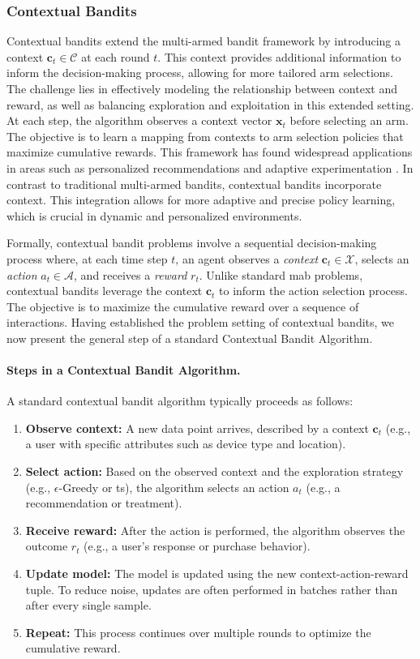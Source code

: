 \subsubsection{Contextual Bandits}
Contextual bandits extend the multi-armed bandit framework by introducing a context $\mathbf{c}_t \in \mathcal{C}$ at each round $t$. This context provides additional information to inform the decision-making process, allowing for more tailored arm selections. The challenge lies in effectively modeling the relationship between context and reward, as well as balancing exploration and exploitation in this extended setting. At each step, the algorithm observes a context vector $\mathbf{x}_t$ before selecting an arm. The objective is to learn a mapping from contexts to arm selection policies that maximize cumulative rewards. This framework has found widespread applications in areas such as personalized recommendations and adaptive experimentation \citep{li2010contextual}. In contrast to traditional multi-armed bandits, contextual bandits incorporate context. This integration allows for more adaptive and precise policy learning, which is crucial in dynamic and personalized environments.
 
Formally, contextual bandit problems involve a sequential decision-making process where, at each time step $t$, an agent observes a \textit{context} $\mathbf{c}_t \in \mathcal{X}$, selects an \textit{action} $a_t \in \mathcal{A}$, and receives a \textit{reward} $r_t$. Unlike standard \ac{mab} problems, contextual bandits leverage the context $\mathbf{c}_t$ to inform the action selection process.  The objective is to maximize the cumulative reward over a sequence of interactions.  Having established the problem setting of contextual bandits, we now present the general step of a standard Contextual Bandit Algorithm.

\paragraph{Steps in a Contextual Bandit Algorithm.}
A standard contextual bandit algorithm typically proceeds as follows:
\begin{enumerate}
    \item \textbf{Observe context:} A new data point arrives, described by a context $\mathbf{c}_t$ (e.g., a user with specific attributes such as device type and location).
    \item \textbf{Select action:} Based on the observed context and the exploration strategy (e.g., $\epsilon$-Greedy or \acl{ts}), the algorithm selects an action $a_t$ (e.g., a recommendation or treatment).
    \item \textbf{Receive reward:} After the action is performed, the algorithm observes the outcome $r_t$ (e.g., a user's response or purchase behavior).
    \item \textbf{Update model:} The model is updated using the new context-action-reward tuple. To reduce noise, updates are often performed in batches rather than after every single sample.
    \item \textbf{Repeat:} This process continues over multiple rounds to optimize the cumulative reward.
\end{enumerate}

